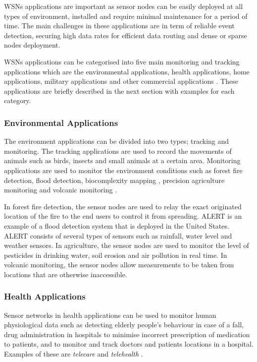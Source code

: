 WSNs applications are important as sensor nodes can be easily deployed at all types of environment, installed and require minimal maintenance for a period of time. The main challenges in these applications are in term of reliable event detection, securing high data rates for efficient data routing and dense or sparse nodes deployment.

WSNs applications can be categorised into five main monitoring and tracking applications which are the environmental applications, health applications, home applications, military applications and other commercial applications \cite{wsnSurvey2}. These applications are briefly described in the next section with examples for each category. 

\subsubsection{Environmental Applications}
The environment applications can be divided into two types; tracking and monitoring. The tracking applications are used to record the movements of animals such as birds, insects and small animals at a certain area. Monitoring applications are used to monitor the environment conditions such as forest fire detection, flood detection, biocomplexity mapping \cite{Cerpahabitatmonitoring}, precision agriculture monitoring and volcanic monitoring \cite{volcano}.

In forest fire detection, the sensor nodes are used to relay the exact originated location of the fire to the end users to control it from spreading. ALERT is an example of a flood detection system that is deployed in the United States. ALERT consists of several types of sensors such as rainfall, water level and weather sensors. In agriculture, the sensor nodes are used to monitor the level of pesticides in drinking water, soil erosion and air pollution in real time. In volcanic monitoring, the sensor nodes allow measurements to be taken from locations that are otherwise inaccessible. 

\subsubsection{Health Applications}
Sensor networks in health applications can be used to monitor human physiological data such as detecting elderly people's behaviour in case of a fall, drug administration \cite{telemonitoring} in hospitals to minimise incorrect prescription of medication to patients, and to monitor and track doctors and patients locations in a hospital. Examples of these are \textit{telecare} and \textit{telehealth} \cite{telehealth}.

